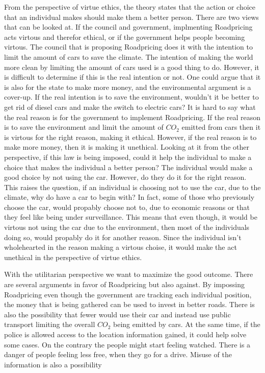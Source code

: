 From the perspective of virtue ethics, the theory states that the action or choice that an individual makes should make them a better person. There are two views that can be looked at. If the council and government, implmenting Roadpricing acts virtous and therefor ethical, or if the government helps people becoming virtous. The council that is proposing Roadpricing does it with the intention to limit the amount of cars to save the climate. The intention of making the world more clean by limiting the amount of cars used is a good thing to do. However, it is difficult to determine if this is the real intention or not. One could argue that it is also for the state to make more money, and the environmental argument is a cover-up. If the real intention is to save the environment, wouldn't it be better to get rid of diesel cars and make the switch to electric cars? It is hard to say what the real reason is for the government to implement Roadpricing. If the real reason is to save the environment and limit the amount of $CO_2$ emitted from cars then it is virtous for the right reason, making it ethical. However, if the real reason is to make more money, then it is making it unethical.   
Looking at it from the other perspective, if this law is being imposed, could it help the individual to make a choice that makes the individual a better person? The individual would make a good choice by not using the car. However, do they do it for the right reason. This raises the question, if an individual is choosing not to use the car, due to the climate, why do have a car to begin with?  
In fact, some of those who previously choose the car, would propably choose not to, due to economic reasons or that they feel like being under surveillance. This means that even though, it would be virtous not using the car due to the environment, then most of the individuals doing so, would propably do it for another reason. Since the individual isn't wholehearted in the reason making a virtous choise, it would make the act unethical in the perspective of virtue ethics.

With the utilitarian perspective we want to maximize the good outcome. There are several arguments in favor of Roadpricing but also against. By impossing Roadpricing even though the government are tracking each individual position, the money that is being gathered can be used to invest in better roads. There is also the possibility that fewer would use their car and instead use public transport limiting the overall $CO_2$ being emitted by cars. At the same time, if the police is allowed access to the location information gained, it could help solve some cases. On the contrary the people might start feeling watched. There is a danger of people feeling less free, when they go for a drive. Misuse of the information is also a possibility